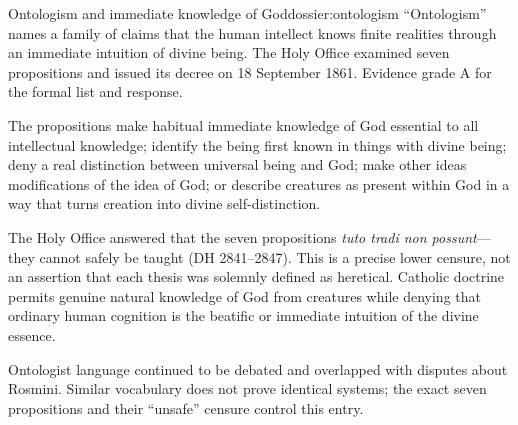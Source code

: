 \begin{heresydossier}{Ontologism and immediate knowledge of God}{dossier:ontologism}
\objectfield ``Ontologism'' names a family of claims that the human intellect knows finite realities through an immediate intuition of divine being. The Holy Office examined seven propositions and issued its decree on 18 September 1861. Evidence grade A for the formal list and response.

\propositionfield The propositions make habitual immediate knowledge of God essential to all intellectual knowledge; identify the being first known in things with divine being; deny a real distinction between universal being and God; make other ideas modifications of the idea of God; or describe creatures as present within God in a way that turns creation into divine self-distinction.

\responsefield The Holy Office answered that the seven propositions \emph{tuto tradi non possunt}---they cannot safely be taught (DH 2841--2847). This is a precise lower censure, not an assertion that each thesis was solemnly defined as heretical. Catholic doctrine permits genuine natural knowledge of God from creatures while denying that ordinary human cognition is the beatific or immediate intuition of the divine essence.

\aftermathfield Ontologist language continued to be debated and overlapped with disputes about Rosmini. Similar vocabulary does not prove identical systems; the exact seven propositions and their ``unsafe'' censure control this entry.
\end{heresydossier}

